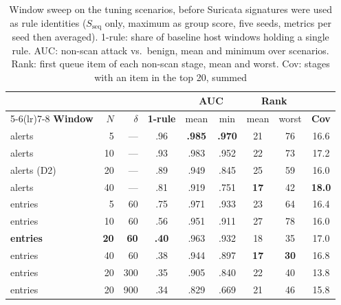 \documentclass[conference]{IEEEtran}
\begin{document}
\begin{table}[t]
\caption{Window sweep on the tuning scenarios, before Suricata signatures were used as rule identities ($S_\mathrm{seq}$ only, maximum as group score, five seeds, metrics per seed then averaged). 1-rule: share of baseline host windows holding a single rule. AUC: non-scan attack vs.\ benign, mean and minimum over scenarios. Rank: first queue item of each non-scan stage, mean and worst. Cov: stages with an item in the top 20, summed}
\label{tab:sweep}
\centering\footnotesize
\setlength{\tabcolsep}{3pt}
\begin{tabular}{@{}lrr c cc cc c@{}}
\toprule
& & & & \multicolumn{2}{c}{\textbf{AUC}} & \multicolumn{2}{c}{\textbf{Rank}} & \\
\cmidrule(lr){5-6}\cmidrule(lr){7-8}
\textbf{Window} & $N$ & $\delta$ & \textbf{1-rule} & mean & min & mean & worst & \textbf{Cov} \\
\midrule
alerts & 5 & --- & .96 & \textbf{.985} & \textbf{.970} & 21 & 76 & 16.6 \\
alerts & 10 & --- & .93 & .983 & .952 & 22 & 73 & 17.2 \\
alerts (D2) & 20 & --- & .89 & .949 & .845 & 25 & 59 & 16.0 \\
alerts & 40 & --- & .81 & .919 & .751 & \textbf{17} & 42 & \textbf{18.0} \\
\midrule
entries & 5 & 60 & .75 & .971 & .933 & 23 & 64 & 16.4 \\
entries & 10 & 60 & .56 & .951 & .911 & 27 & 78 & 16.0 \\
\textbf{entries} & \textbf{20} & \textbf{60} & \textbf{.40} & .963 & .932 & 18 & 35 & 17.0 \\
entries & 40 & 60 & .38 & .944 & .897 & \textbf{17} & \textbf{30} & 16.8 \\
entries & 20 & 300 & .35 & .905 & .840 & 22 & 40 & 13.8 \\
entries & 20 & 900 & .34 & .829 & .669 & 21 & 46 & 15.8 \\
\bottomrule
\end{tabular}
\end{table}
\end{document}
